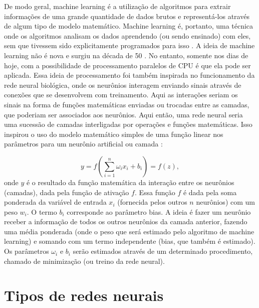 \documentclass[a4paper,12pt,oneside]{book}
\begin{document}
\par De modo geral, machine learning é a utilização de algoritmos para extrair informações de uma grande quantidade de dados brutos e representá-los através de algum tipo de modelo matemático. Machine learning é, portanto, uma técnica onde os algoritmos analisam os dados aprendendo (ou sendo ensinado) com eles, sem que tivessem sido explicitamente programados para isso \cite{mlbook}. A ideia de machine learning não é nova e surgiu na década de 50 \cite{curso, mlbook}. No entanto, somente nos dias de hoje, com a possibilidade de processamento paralelos de CPU é que ela pode ser aplicada. Essa ideia de processamento foi também inspirada no funcionamento da rede neural biológica, onde os neurônios interagem enviando sinais através de conexões que se desenvolvem com treinamento. Aqui as interações seriam os sinais na forma de funções matemáticas enviadas ou trocadas entre as camadas, que poderiam ser associados aos neurônios. Aqui então, uma rede neural seria uma sucessão de camadas interligadas por operações e funções matemáticas. Isso inspirou o uso do modelo matemático simples de uma função linear nos parâmetros para um neurônio artificial ou camada \cite{curso}:

\begin{equation}\label{eq:model_n}
    y = f\left(\sum^{n}_{i = 1}\omega_i x_i + b_i\right) = f(z),
\end{equation}
%
onde $y$ é o resultado da função matemática da interação entre os neurônios (camadas), dada pela função de ativação $f$. Essa função $f$ é dada pela soma ponderada da variável de entrada $x_i$ (fornecida pelos outros $n$ neurônios) com um peso $w_i$. O termo $b_i$ corresponde ao parâmetro bias. A ideia é fazer um neurônio receber a informação de todos os outros neurônios da camada anterior, fazendo uma média ponderada (onde o peso que será estimado pelo algoritmo de machine learning) e somando com um termo independente (bias, que também é estimado). Os parâmetros $\omega_i$ e $b_i$ serão estimados através de um determinado procedimento, chamado de minimização (ou treino da rede neural).

\section{Tipos de redes neurais}
\end{document}
